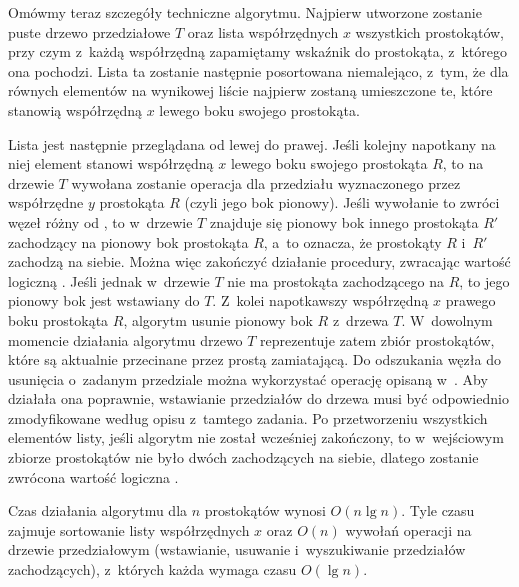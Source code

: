 Omówmy teraz szczegóły techniczne algorytmu.
Najpierw utworzone zostanie puste drzewo przedziałowe $T$ oraz lista współrzędnych $x$ wszystkich prostokątów, przy czym z~każdą współrzędną zapamiętamy wskaźnik do prostokąta, z~którego ona pochodzi.
Lista ta zostanie następnie posortowana niemalejąco, z~tym, że dla równych elementów na wynikowej liście najpierw zostaną umieszczone te, które stanowią współrzędną $x$ lewego boku swojego prostokąta.

Lista jest następnie przeglądana od lewej do prawej.
Jeśli kolejny napotkany na niej element stanowi współrzędną $x$ lewego boku swojego prostokąta $R$, to na drzewie $T$ wywołana zostanie operacja  dla przedziału wyznaczonego przez współrzędne $y$ prostokąta $R$ (czyli jego bok pionowy).
Jeśli wywołanie to zwróci węzeł różny od , to w~drzewie $T$ znajduje się pionowy bok innego prostokąta $R'$ zachodzący na pionowy bok prostokąta $R$, a~to oznacza, że prostokąty $R$ i~$R'$ zachodzą na siebie.
Można więc zakończyć działanie procedury, zwracając wartość logiczną .
Jeśli jednak w~drzewie $T$ nie ma prostokąta zachodzącego na $R$, to jego pionowy bok jest wstawiany do $T$.
Z~kolei napotkawszy współrzędną $x$ prawego boku prostokąta $R$, algorytm usunie pionowy bok $R$ z~drzewa $T$.
W~dowolnym momencie działania algorytmu drzewo $T$ reprezentuje zatem zbiór prostokątów, które są aktualnie przecinane przez prostą zamiatającą.
Do odszukania węzła do usunięcia o~zadanym przedziale można wykorzystać operację  opisaną w~.
Aby działała ona poprawnie, wstawianie przedziałów do drzewa musi być odpowiednio zmodyfikowane według opisu z~tamtego zadania.
Po przetworzeniu wszystkich elementów listy, jeśli algorytm nie został wcześniej zakończony, to w~wejściowym zbiorze prostokątów nie było dwóch zachodzących na siebie, dlatego zostanie zwrócona wartość logiczna .

Czas działania algorytmu dla $n$ prostokątów wynosi $O(n\lg n)$.
Tyle czasu zajmuje sortowanie listy współrzędnych $x$ oraz $O(n)$ wywołań operacji na drzewie przedziałowym (wstawianie, usuwanie i~wyszukiwanie przedziałów zachodzących), z~których każda wymaga czasu $O(\lg n)$.
